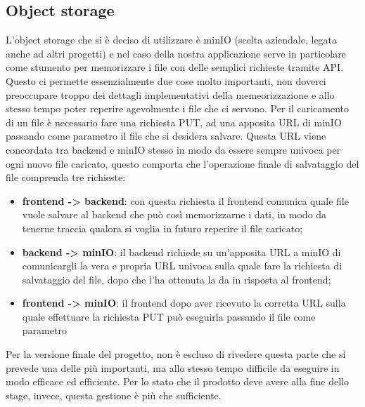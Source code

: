 \subsection{Object storage}
L'object storage che si è deciso di utilizzare è minIO (scelta aziendale, legata anche ad altri progetti) e nel caso della nostra applicazione serve in particolare come stumento
per memorizzare i file con delle semplici richieste tramite API.
Questo ci permette essenzialmente due cose molto importanti, non doverci preoccupare troppo dei dettagli implementativi della memeorizzazione e allo stesso tempo poter
reperire agevolmente i file che ci servono. Per il caricamento di un file è necessario fare una richiesta PUT, ad una apposita URL di minIO passando come parametro il file che si desidera salvare.
Questa URL viene concordata tra backend e minIO stesso in modo da essere sempre univoca per ogni nuovo file caricato, questo comporta che l'operazione finale di salvataggio del file
comprenda tre richieste:
\begin{itemize}
  \item \textbf{frontend -> backend}: con questa richiesta il frontend comunica quale file vuole salvare al backend che può così memorizzarne i dati, in modo da tenerne traccia qualora si voglia in
        futuro reperire il file caricato;
  \item \textbf{backend -> minIO}: il backend richiede su un'apposita URL a minIO di comunicargli la vera e propria URL univoca sulla quale fare la richiesta di salvataggio del file,
        dopo che l'ha ottenuta la da in risposta al frontend;
  \item \textbf{frontend -> minIO}: il frontend dopo aver ricevuto la corretta URL sulla quale effettuare la richiesta PUT può eseguirla passando il file come parametro
\end{itemize}
Per la versione finale del progetto, non è escluso di rivedere questa parte che si prevede una delle più importanti, ma allo stesso tempo difficile da eseguire in modo efficace ed
efficiente. Per lo stato che il prodotto deve avere alla fine dello stage, invece, questa gestione è più che sufficiente.

